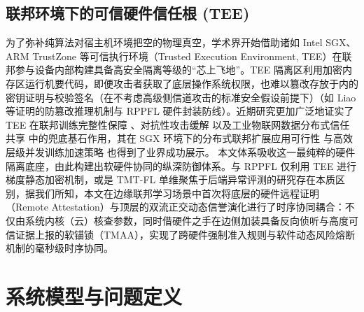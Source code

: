 \documentclass[11pt, a4paper, UTF8, fontset=fandol]{ctexart}
\begin{document}
\subsection{联邦环境下的可信硬件信任根 (TEE)}
为了弥补纯算法对宿主机环境把空的物理真空，学术界开始借助诸如 Intel SGX、ARM TrustZone 等可信执行环境（Trusted Execution Environment, TEE）在联邦参与设备内部构建具备高安全隔离等级的“芯上飞地”。TEE 隔离区利用加密内存区运行机要代码，即便攻击者获取了底层操作系统权限，也难以篡改存放于内的密钥证明与校验签名（在不考虑高级侧信道攻击的标准安全假设前提下）（如 Liao 等证明的防篡改推理机制\cite{liao2024verifiable}与 RPPFL 硬件封装防线\cite{zhang2025rppfl}）。近期研究更加广泛地证实了 TEE 在联邦训练完整性保障 \cite{r1_tee_integrity}、对抗性攻击缓解 \cite{r5_tee_mitigating} 以及工业物联网数据分布式信任共享 \cite{r12_iot_tee} 中的兜底基石作用，其在 SGX 环境下的分布式联邦扩展应用可行性 \cite{xu2021distributed} 与高效层级并发训练加速策略 \cite{yan2024efficient} 也得到了业界成功展示。
本文体系吸收这一最纯粹的硬件隔离底座，由此构建出软硬件协同的纵深防御体系。与 RPPFL \cite{zhang2025rppfl} 仅利用 TEE 进行梯度静态加密机制，或是 TMT-FL \cite{lu2025tmt} 单维聚焦于后端异常评测的研究存在本质区别，据我们所知，本文在边缘联邦学习场景中首次将底层的硬件远程证明（Remote Attestation）与顶层的双流正交动态信誉演化进行了时序协同耦合：不仅由系统内核（云）核查参数，同时借硬件之手在边侧加装具备反向侦听与高度可信证据上报的软锚锁（TMAA），实现了跨硬件强制准入规则与软件动态风险熔断机制的毫秒级时序协同。


\section{系统模型与问题定义}
\end{document}
